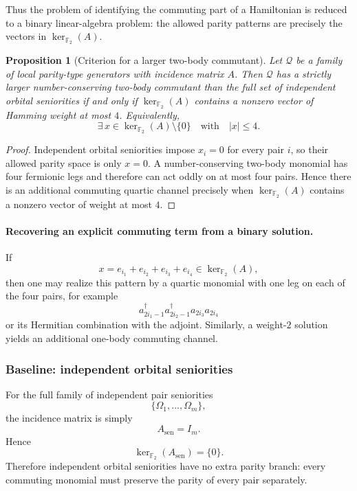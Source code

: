 \documentclass[11pt]{article}
\newcommand{\F}{\mathbb{F}_2}
\newtheorem{proposition}[theorem]{Proposition}
\theoremstyle{definition}
\theoremstyle{remark}
\begin{document}
Thus the problem of identifying the commuting part of a Hamiltonian is reduced to a binary linear-algebra problem:
the allowed parity patterns are precisely the vectors in $\ker_{\F}(A)$.

\begin{proposition}[Criterion for a larger two-body commutant]
Let $\mathcal Q$ be a family of local parity-type generators with incidence matrix $A$.
Then $\mathcal Q$ has a strictly larger number-conserving two-body commutant than the full set of independent orbital seniorities
if and only if $\ker_{\F}(A)$ contains a nonzero vector of Hamming weight at most $4$.
Equivalently,
\begin{equation}
  \exists\, x\in \ker_{\F}(A)\setminus\{0\}
  \quad \text{with} \quad
  |x|\le 4.
\end{equation}
\end{proposition}

\begin{proof}
Independent orbital seniorities impose $x_i=0$ for every pair $i$, so their allowed parity space is only $x=0$.
A number-conserving two-body monomial has four fermionic legs and therefore can act oddly on at most four pairs.
Hence there is an additional commuting quartic channel precisely when $\ker_{\F}(A)$ contains a nonzero vector of weight at most $4$.
\end{proof}

\paragraph{Recovering an explicit commuting term from a binary solution.}
If
\begin{equation}
  x=e_{i_1}+e_{i_2}+e_{i_3}+e_{i_4}\in \ker_{\F}(A),
\end{equation}
then one may realize this pattern by a quartic monomial with one leg on each of the four pairs, for example
\begin{equation}
  a_{2i_1-1}^\dagger a_{2i_2-1}^\dagger a_{2i_3} a_{2i_4}
\end{equation}
or its Hermitian combination with the adjoint.
Similarly, a weight-$2$ solution yields an additional one-body commuting channel.

\subsubsection{Baseline: independent orbital seniorities}

For the full family of independent pair seniorities
\begin{equation}
  \{\Omega_1,\dots,\Omega_m\},
\end{equation}
the incidence matrix is simply
\begin{equation}
  A_{\mathrm{sen}}=I_m.
\end{equation}
Hence
\begin{equation}
  \ker_{\F}(A_{\mathrm{sen}})=\{0\}.
\end{equation}
Therefore independent orbital seniorities have no extra parity branch: every commuting monomial must preserve the parity of every pair separately.
\end{document}
